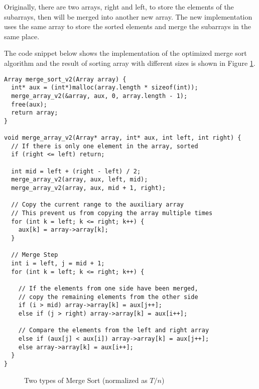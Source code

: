 \documentclass[a4paper,11pt]{article}
\begin{document}
Originally, there are two arrays, right and left, to store the elements of the subarrays, then will
be merged into another new array. The new implementation uses the same array to store the sorted elements
and merge the subarrays in the same place.

The code snippet below shows the implementation of the optimized merge sort algorithm and the result
of sorting array with different sizes is shown in Figure \ref{fig:merge-sort-optimized}.

\begin{verbatim}
Array merge_sort_v2(Array array) {
  int* aux = (int*)malloc(array.length * sizeof(int));
  merge_array_v2(&array, aux, 0, array.length - 1);
  free(aux);
  return array;
}

void merge_array_v2(Array* array, int* aux, int left, int right) {
  // If there is only one element in the array, sorted
  if (right <= left) return;

  int mid = left + (right - left) / 2;
  merge_array_v2(array, aux, left, mid);
  merge_array_v2(array, aux, mid + 1, right);

  // Copy the current range to the auxiliary array
  // This prevent us from copying the array multiple times
  for (int k = left; k <= right; k++) {
    aux[k] = array->array[k];
  }

  // Merge Step
  int i = left, j = mid + 1;
  for (int k = left; k <= right; k++) {

    // If the elements from one side have been merged,
    // copy the remaining elements from the other side
    if (i > mid) array->array[k] = aux[j++];
    else if (j > right) array->array[k] = aux[i++];

    // Compare the elements from the left and right array
    else if (aux[j] < aux[i]) array->array[k] = aux[j++];
    else array->array[k] = aux[i++];
  }
}
\end{verbatim}

\begin{figure}[H]
  \centering
  \caption{Two types of Merge Sort (normalized as $T/n$)}
  \label{fig:merge-sort-optimized}
\end{figure}
\end{document}
